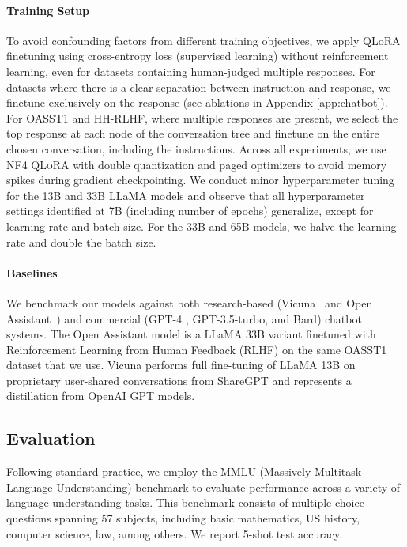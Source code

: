 \paragraph{Training Setup} To avoid confounding factors from different training objectives, we apply QLoRA finetuning using cross-entropy loss (supervised learning) without reinforcement learning, even for datasets containing human-judged multiple responses. For datasets where there is a clear separation between instruction and response, we finetune exclusively on the response (see ablations in Appendix \ref{app:chatbot}). For OASST1 and HH-RLHF, where multiple responses are present, we select the top response at each node of the conversation tree and finetune on the entire chosen conversation, including the instructions. Across all experiments, we use NF4 \textsc{QLoRA} with double quantization and paged optimizers to avoid memory spikes during gradient checkpointing. We conduct minor hyperparameter tuning for the 13B and 33B LLaMA models and observe that all hyperparameter settings identified at 7B (including number of epochs) generalize, except for learning rate and batch size. For the 33B and 65B models, we halve the learning rate and double the batch size.

\paragraph{Baselines} We benchmark our models against both research-based (Vicuna~\citep{vicuna2023} and Open Assistant~\citep{kopf2023openassistant}) and commercial (GPT-4 \citep{openai2023gpt}, GPT-3.5-turbo, and Bard) chatbot systems. The Open Assistant model is a LLaMA 33B variant finetuned with Reinforcement Learning from Human Feedback (RLHF) on the same OASST1 dataset that we use. Vicuna performs full fine-tuning of LLaMA 13B on proprietary user-shared conversations from ShareGPT and represents a distillation from OpenAI GPT models.

\subsection{Evaluation}

Following standard practice, we employ the MMLU (Massively Multitask Language Understanding) benchmark \citep{hendrycksmeasuring} to evaluate performance across a variety of language understanding tasks. This benchmark consists of multiple-choice questions spanning 57 subjects, including basic mathematics, US history, computer science, law, among others. We report 5-shot test accuracy.

